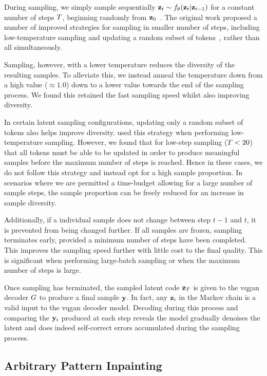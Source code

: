During sampling, we simply sample sequentially $\mathbf{z}_t \sim f_\theta(\mathbf{z}_t
\vert \mathbf{z}_{t-1})$ for a constant number of steps $T$, beginning
randomly from $\mathbf{z}_0$~\cite{savinov2022stepunrolled}. The original work
proposed a number of improved strategies for sampling in smaller number of
steps, including low-temperature sampling and updating a random subset of
tokens~\cite{savinov2022stepunrolled}, rather than all simultaneously.

Sampling, however, with a lower temperature reduces the diversity of the
resulting samples. To alleviate this, we instead anneal the temperature down
from a high value ($\approx 1.0$) down to a lower value towards the end of the
sampling process. We found this retained the fast sampling speed whilst also
improving diversity.

In certain latent sampling configurations, updating only a random subset of
tokens also helps improve diversity. \cite{savinov2022stepunrolled} used this
strategy when performing low-temperature sampling. However, we found that for
low-step sampling ($T<20$) that all tokens must be able to be updated
in order to produce meaningful samples before the maximum number of steps is
reached. Hence in these cases, we do not follow this strategy and instead opt
for a high sample proportion. In scenarios where we are permitted a time-budget
allowing for a large number of sample steps, the sample proportion can be freely
reduced for an increase in sample diversity.

Additionally, if a individual sample does not change between step $t-1$ and $t$,
it is prevented from being changed further. If all samples are frozen, sampling
terminates early, provided a minimum number of steps have been completed. This
improves the sampling speed further with little cost to the final quality. This
is significant when performing large-batch sampling or when the maximum number
of steps is large.

Once sampling has terminated, the sampled latent code $\mathbf{z}_T$ is given
to the \gls{vqgan} decoder $G$ to produce a final sample $\mathbf{y}$. In
fact, any $\mathbf{z}_i$ in the Markov chain is a valid input to the \gls{vqgan}
decoder model. Decoding during this process and comparing the $\mathbf{y}_i$
produced at each step reveals the model gradually denoises the latent and does
indeed self-correct errors accumulated during the sampling process.

\subsection{Arbitrary Pattern Inpainting}
\label{subsec:inpainting}

